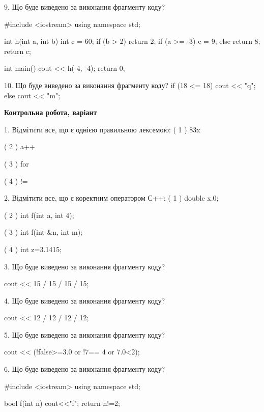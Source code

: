 \documentclass[11pt, ukrainian]{article}
\begin{document}
\begin{large}

9. Що буде виведено за виконання фрагменту коду?

#include <iostream>
using namespace std;

int h(int a, int b){
    int c = 60;
    if (b > 2)
        return 2;
    if (a >= -3)
         c = 9;
    else 
        return 8;
    return c;
}

int main(){
    cout << h(-4, -4);
    return 0;
}


10. Що буде виведено за виконання фрагменту коду?
if (18 <= 18)
    cout << "q";
else
    cout << "m";


\end{large}
\newpage
\begin{large}
\textbf{Контрольна робота, варіант }\par

1. Відмітити все, що є однією правильною лексемою:
( 1 ) 83x

( 2 ) a++

( 3 ) for

( 4 ) !=


2. Відмітити все, що є коректним оператором С++:
( 1 ) double x.0;

( 2 ) int f(int a, int 4);

( 3 ) int f(int &n, int m);

( 4 ) int z=3.1415;


3. Що буде виведено за виконання фрагменту коду?

cout << 15 / 15 / 15 / 15;


4. Що буде виведено за виконання фрагменту коду?

cout << 12 / 12 / 12 / 12;


5. Що буде виведено за виконання фрагменту коду?

cout << (!false>=3.0 or !7== 4 or 7.0<2);


6. Що буде виведено за виконання фрагменту коду?

#include <iostream>
using namespace std;

bool f(int n){
    cout<<"f";
    return n!=2;
}


\end{large}
\end{document}
